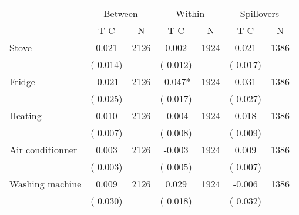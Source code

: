 
\begin{tabular}{l*{6}{c}}\hline&\multicolumn{2}{c}{Between}&\multicolumn{2}{c}{Within}&\multicolumn{2}{c}{Spillovers} \\ \cmidrule(r){2-3}\cmidrule(l){4-5}\cmidrule(l){6-7} & {T-C} & {N} & {T-C} & {N}  & {T-C}  & {N}  \\ \midrule
Stove        &              0.021      &       2126       &              0.002      &       1924       &              0.021      &       1386       \\
                       &       (       0.014)            &                               &       (       0.012)            &                               &       (       0.017)            &                               \\
Fridge        &             -0.021      &       2126       &             -0.047*      &       1924       &              0.031      &       1386       \\
                       &       (       0.025)            &                               &       (       0.017)            &                               &       (       0.027)            &                               \\
Heating        &              0.010      &       2126       &             -0.004      &       1924       &              0.018      &       1386       \\
                       &       (       0.007)            &                               &       (       0.008)            &                               &       (       0.009)            &                               \\
Air conditionner        &              0.003      &       2126       &             -0.003      &       1924       &              0.009      &       1386       \\
                       &       (       0.003)            &                               &       (       0.005)            &                               &       (       0.007)            &                               \\
Washing machine        &              0.009      &       2126       &              0.029      &       1924       &             -0.006      &       1386       \\
                       &       (       0.030)            &                               &       (       0.018)            &                               &       (       0.032)            &                               \\

\end{tabular}
